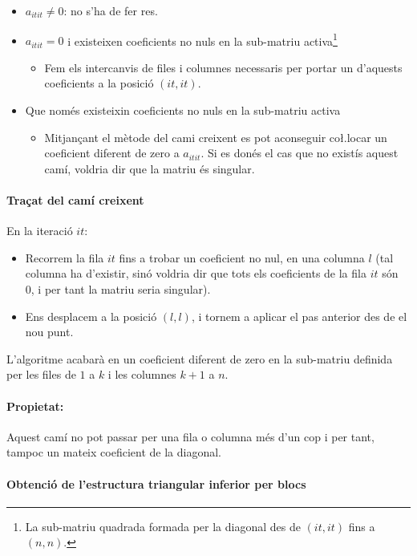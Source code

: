 \documentclass[11pt,a4paper,twoside]{report}
\begin{document}
\begin{itemize}
\item $a_{it it} \neq 0$: no s'ha de fer res.
\item  $a_{it it} = 0$ i existeixen coeficients no nuls en la sub-matriu activa\footnote{La sub-matriu quadrada formada per la diagonal des de $(it,it)$ fins a $(n,n)$.}
\begin{itemize}
\item Fem els intercanvis de files i columnes necessaris per portar un d'aquests coeficients a la posició $(it, it)$.
\end{itemize}
\item Que només existeixin coeficients no nuls en la sub-matriu activa\footnotemark[\value{footnote}]
\begin{itemize}
\item Mitjançant el mètode del cami creixent es pot aconseguir co\l.locar un coeficient diferent de zero a $a_{it it}$. Si es donés el cas que no existís aquest camí, voldria dir que la matriu és singular.
\end{itemize}
\end{itemize}

\paragraph{Traçat del camí creixent} \mbox{}

En la iteració $it$:
\begin{itemize}
\item Recorrem la fila $it$ fins a trobar un coeficient no nul, en una columna $l$ (tal columna ha d'existir, sinó voldria dir que tots els coeficients de la fila $it$ són 0, i per tant la matriu seria singular).
\item Ens desplacem a la posició $(l,l)$, i tornem a aplicar el pas anterior des de el nou punt.
\end{itemize}
 
L'algoritme acabarà en un coeficient diferent de zero en la sub-matriu definida per les files de $1$ a $k$ i les columnes $k+1$ a $n$.

\paragraph*{Propietat:}Aquest camí no pot passar per una fila o columna més d'un cop i per tant, tampoc un mateix coeficient de la diagonal.

\paragraph{Obtenció de l'estructura triangular inferior per blocs} \mbox{}
\end{document}
